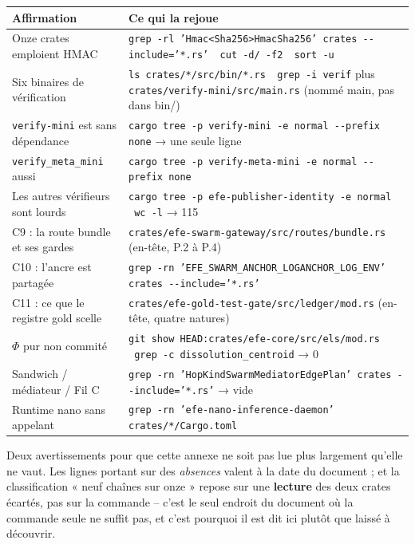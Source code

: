 \documentclass[10pt]{article}
\newcommand{\sz}[1]{{\small\color{grey}\textsf{#1}}}
\newcommand{\code}[1]{\texttt{\small #1}}
\begin{document}
\renewcommand{\arraystretch}{1.22}
\begin{center}\small
\begin{tabular}{@{}>{\raggedright\arraybackslash}p{5.3cm} >{\raggedright\arraybackslash}p{10.8cm}@{}}
\toprule
\textbf{Affirmation} & \textbf{Ce qui la rejoue} \\
\midrule
Onze crates emploient HMAC \newline \sz{(neuf après lecture)} &
  \code{grep -rl 'Hmac<Sha256>\textbar HmacSha256' crates -{}-include='*.rs' \textbar\ cut -d/ -f2 \textbar\ sort -u} \\
Six binaires de vérification & \code{ls crates/*/src/bin/*.rs \textbar\ grep -i verif} \newline
  \sz{plus} \code{crates/verify-mini/src/main.rs} \sz{(nommé main, pas dans bin/)} \\
\code{verify-mini} est sans dépendance & \code{cargo tree -p verify-mini -e normal -{}-prefix none} \sz{→ une seule ligne} \\
\code{verify\_meta\_mini} aussi & \code{cargo tree -p verify-meta-mini -e normal -{}-prefix none} \\
Les autres vérifieurs sont lourds & \code{cargo tree -p efe-publisher-identity -e normal \textbar\ wc -l} \sz{→ 115} \\
C9 : la route bundle et ses gardes & \code{crates/efe-swarm-gateway/src/routes/bundle.rs} \sz{(en-tête, P.2 à P.4)} \\
C10 : l'ancre est partagée & \code{grep -rn 'EFE\_SWARM\_ANCHOR\_LOG\textbar ANCHOR\_LOG\_ENV' crates -{}-include='*.rs'} \\
C11 : ce que le registre gold scelle & \code{crates/efe-gold-test-gate/src/ledger/mod.rs} \sz{(en-tête, quatre natures)} \\
$\Phi$ pur non commité & \code{git show HEAD:crates/efe-core/src/els/mod.rs \textbar\ grep -c dissolution\_centroid} \sz{→ 0} \\
Sandwich / médiateur / Fil C & \code{grep -rn 'HopKind\textbar SwarmMediator\textbar EdgePlan' crates -{}-include='*.rs'} \sz{→ vide} \\
Runtime nano sans appelant & \code{grep -rn 'efe-nano-inference-daemon' crates/*/Cargo.toml} \\
\bottomrule
\end{tabular}
\end{center}

Deux avertissements pour que cette annexe ne soit pas lue plus largement qu'elle ne vaut. Les lignes
portant sur des \emph{absences} valent à la date du document ; et la classification « neuf chaînes sur
onze » repose sur une \textbf{lecture} des deux crates écartés, pas sur la commande -- c'est le seul
endroit du document où la commande seule ne suffit pas, et c'est pourquoi il est dit ici plutôt que
laissé à découvrir.
\end{document}
